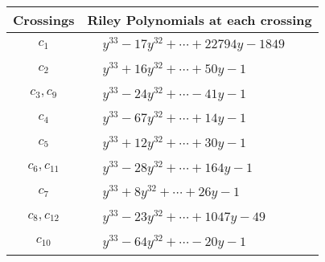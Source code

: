 \documentclass[1p]{elsarticle_modified}
\theoremstyle{definition}
\begin{document}
\begin{tabular}{m{50pt}|m{274pt}}
Crossings & \hspace{64pt}Riley Polynomials at each crossing \\
\hline $$\begin{aligned}c_{1}\end{aligned}$$&$\begin{aligned}
&y^{33}-17 y^{32}+\cdots+22794 y-1849
\end{aligned}$\\
\hline $$\begin{aligned}c_{2}\end{aligned}$$&$\begin{aligned}
&y^{33}+16 y^{32}+\cdots+50 y-1
\end{aligned}$\\
\hline $$\begin{aligned}c_{3},c_{9}\end{aligned}$$&$\begin{aligned}
&y^{33}-24 y^{32}+\cdots-41 y-1
\end{aligned}$\\
\hline $$\begin{aligned}c_{4}\end{aligned}$$&$\begin{aligned}
&y^{33}-67 y^{32}+\cdots+14 y-1
\end{aligned}$\\
\hline $$\begin{aligned}c_{5}\end{aligned}$$&$\begin{aligned}
&y^{33}+12 y^{32}+\cdots+30 y-1
\end{aligned}$\\
\hline $$\begin{aligned}c_{6},c_{11}\end{aligned}$$&$\begin{aligned}
&y^{33}-28 y^{32}+\cdots+164 y-1
\end{aligned}$\\
\hline $$\begin{aligned}c_{7}\end{aligned}$$&$\begin{aligned}
&y^{33}+8 y^{32}+\cdots+26 y-1
\end{aligned}$\\
\hline $$\begin{aligned}c_{8},c_{12}\end{aligned}$$&$\begin{aligned}
&y^{33}-23 y^{32}+\cdots+1047 y-49
\end{aligned}$\\
\hline $$\begin{aligned}c_{10}\end{aligned}$$&$\begin{aligned}
&y^{33}-64 y^{32}+\cdots-20 y-1
\end{aligned}$\\
\hline
\end{tabular}\\~\\
\end{document}
